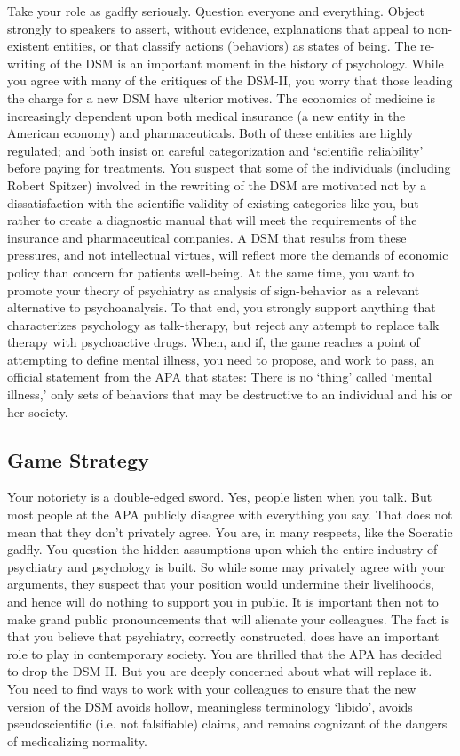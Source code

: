 Take your role as gadfly seriously. Question everyone and everything. Object strongly to speakers to assert, without evidence, explanations that appeal to non-existent entities, or that classify actions (behaviors) as states of being.
The re-writing of the DSM is an important moment in the history of psychology. While you agree with many of the critiques of the DSM-II, you worry that those leading the charge for a new DSM have ulterior motives. The economics of medicine is increasingly dependent upon both medical insurance (a new entity in the American economy) and pharmaceuticals. Both of these entities are highly regulated; and both insist on careful categorization and `scientific reliability' before paying for treatments. You suspect that some of the individuals (including Robert Spitzer) involved in the rewriting of the DSM are motivated not by a dissatisfaction with the scientific validity of existing categories like you, but rather to create a diagnostic manual that will meet the requirements of the insurance and pharmaceutical companies. A DSM that results from these pressures, and not intellectual virtues, will reflect more the demands of economic policy than concern for patients well-being.
At the same time, you want to promote your theory of psychiatry as analysis of sign-behavior as a relevant alternative to psychoanalysis. To that end, you strongly support anything that characterizes psychology as talk-therapy, but reject any attempt to replace talk therapy with psychoactive drugs.
When, and if, the game reaches a point of attempting to define mental illness, you need to propose, and work to pass, an official statement from the APA that states:
 There is no `thing' called `mental illness,' only sets of behaviors that may be destructive to an individual and his or her society.

\subsection{Game Strategy}
\label{gamestrategy}

Your notoriety is a double-edged sword. Yes, people listen when you talk. But most people at the APA publicly disagree with everything you say. That does not mean that they don't privately agree.
You are, in many respects, like the Socratic gadfly. You question the hidden assumptions upon which the entire industry of psychiatry and psychology is built. So while some may privately agree with your arguments, they suspect that your position would undermine their livelihoods, and hence will do nothing to support you in public.
It is important then not to make grand public pronouncements that will alienate your colleagues. The fact is that you believe that psychiatry, correctly constructed, does have an important role to play in contemporary society. You are thrilled that the APA has decided to drop the DSM II. But you are deeply concerned about what will replace it. You need to find ways to work with your colleagues to ensure that the new version of the DSM avoids hollow, meaningless terminology ‘libido’, avoids pseudoscientific (i.e. not falsifiable) claims, and remains cognizant of the dangers of medicalizing normality.

